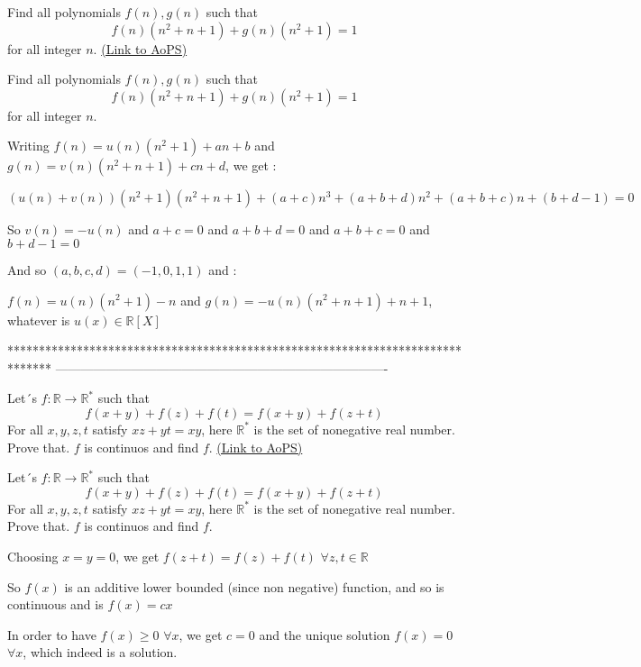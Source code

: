 \begin{problem}
	Find all polynomials $f(n), g(n)$ such that \[f(n)(n^2 + n + 1) + g(n)(n^2 + 1) = 1\] for all integer $n.$
	\flushright \href{https://artofproblemsolving.com/community/c6h558187}{(Link to AoPS)}
\end{problem}



\begin{solution}
	\begin{tcolorbox}Find all polynomials $f(n), g(n)$ such that \[f(n)(n^2 + n + 1) + g(n)(n^2 + 1) = 1\] for all integer $n.$\end{tcolorbox}
Writing $f(n)=u(n)(n^2+1)+an+b$ and $g(n)=v(n)(n^2+n+1)+cn+d$, we get :

$(u(n)+v(n))(n^2+1)(n^2+n+1)+(a+c)n^3+(a+b+d)n^2+(a+b+c)n+(b+d-1)=0$

So $v(n)=-u(n)$ and $a+c=0$ and $a+b+d=0$ and $a+b+c=0$ and $b+d-1=0$

And so $(a,b,c,d)=(-1,0,1,1)$ and :

$f(n)=u(n)(n^2+1)-n$ and $g(n)=-u(n)(n^2+n+1)+n+1$, whatever is $u(x)\in\mathbb R[X]$
\end{solution}
*******************************************************************************
-------------------------------------------------------------------------------

\begin{problem}
	Let´s $f: \mathbb{R} \to\mathbb{R}^{*} $ such that
\[f(x+y)+f(z)+f(t)=f(x+y)+f(z+t) \] 
For all $x,y,z,t$ satisfy $xz+yt=xy$, here $\mathbb{R}^{*}$ is the set of nonegative real number. Prove that. $f$ is continuos and find $f$.
	\flushright \href{https://artofproblemsolving.com/community/c6h558318}{(Link to AoPS)}
\end{problem}



\begin{solution}
	\begin{tcolorbox}Let´s $f: \mathbb{R} \to\mathbb{R}^{*} $ such that
\[f(x+y)+f(z)+f(t)=f(x+y)+f(z+t) \] 
For all $x,y,z,t$ satisfy $xz+yt=xy$, here $\mathbb{R}^{*}$ is the set of nonegative real number. Prove that. $f$ is continuos and find $f$.\end{tcolorbox}
Choosing $x=y=0$, we get $f(z+t)=f(z)+f(t)$ $\forall z,t\in\mathbb R$

So $f(x)$ is an additive lower bounded (since non negative) function, and so is continuous and is $f(x)=cx$

In order to have $f(x)\ge 0$ $\forall x$, we get $c=0$ and the unique solution $\boxed{f(x)=0}$ $\forall x$, which indeed is a solution.
\end{solution}



